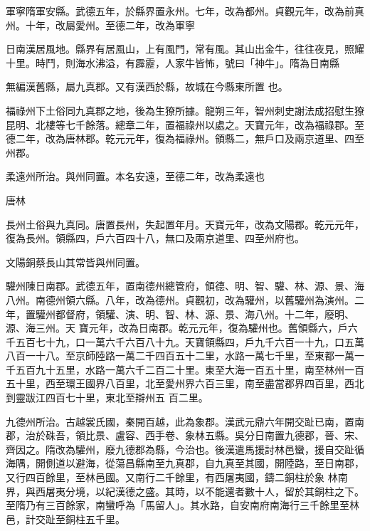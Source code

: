 \begin{pinyinscope}
 軍寧隋軍安縣。武德五年，於縣界置永州。七年，改為都州。貞觀元年，改為前真州。十年，改屬愛州。至德二年，改為軍寧



 日南漢居風地。縣界有居風山，上有風門，常有風。其山出金牛，往往夜見，照耀十里。時鬥，則海水沸溢，有霹靂，人家牛皆怖，號曰「神牛」。隋為日南縣



 無編漢舊縣，屬九真郡。又有漢西於縣，故城在今縣東所置
 也。



 福祿州下土俗同九真郡之地，後為生獠所據。龍朔三年，智州刺史謝法成招慰生獠昆明、北樓等七千餘落。總章二年，置福祿州以處之。天寶元年，改為福祿郡。至德二年，改為唐林郡。乾元元年，復為福祿州。領縣二，無戶口及兩京道里、四至州郡。



 柔遠州所治。與州同置。本名安遠，至德二年，改為柔遠也



 唐林



 長州土俗與九真同。唐置長州，失起置年月。天寶元年，改為文陽郡。乾元元年，復為長州。領縣四，戶六百四十八，無口及兩京道里、四至州府也。



 文陽銅蔡長山其常皆與州同置。



 驩州陳日南郡。武德五年，置南德州總管府，領德、明、智、驩、林、源、景、海八州。南德州領六縣。八年，改為德州。貞觀初，改為驩州，以舊驩州為演州。二年，置驩州都督府，領驩、演、明、智、林、源、景、海八州。十二年，廢明、源、海三州。天
 寶元年，改為日南郡。乾元元年，復為驩州也。舊領縣六，戶六千五百七十九，口一萬六千六百八十九。天寶領縣四，戶九千六百一十九，口五萬八百一十八。至京師陸路一萬二千四百五十二里，水路一萬七千里，至東都一萬一千五百九十五里，水路一萬六千二百二十里。東至大海一百五十里，南至林州一百五十里，西至環王國界八百里，北至愛州界六百三里，南至盡當郡界四百里，西北到靈跋江四百七十里，東北至辯州五
 百二里。



 九德州所治。古越裳氏國，秦開百越，此為象郡。漢武元鼎六年開交趾已南，置南郡，治於硃吾，領比景、盧容、西手卷、象林五縣。吳分日南置九德郡，晉、宋、齊因之。隋改為驩州，廢九德郡為縣，今治也。後漢遣馬援討林邑蠻，援自交趾循海隅，開側道以避海，從蕩昌縣南至九真郡，自九真至其國，開陸路，至日南郡，又行四百餘里，至林邑國。又南行二千餘里，有西屠夷國，鑄二銅柱於象
 林南界，與西屠夷分境，以紀漢德之盛。其時，以不能還者數十人，留於其銅柱之下。至隋乃有三百餘家，南蠻呼為「馬留人」。其水路，自安南府南海行三千餘里至林邑，計交趾至銅柱五千里。




\end{pinyinscope}
